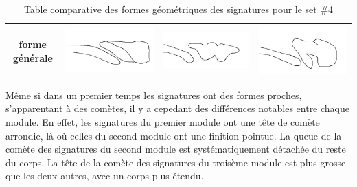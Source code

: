 \begin{table}[h]
\begin{tabular}{|c|c|c|c|}
\hline
\hline
forme générale & \includegraphics[scale=0.2]{images/gen1.png} & \includegraphics[scale=0.2]{images/gen2.png} & \includegraphics[scale=0.2]{images/gen3.png} \\
\hline
\end{tabular}
\caption{Table comparative des formes géométriques des signatures pour le set \#4}
\label{compa}
\end{table}

Même si dans un premier temps les signatures ont des formes proches, s'apparentant à des comètes, il y a cepedant des différences notables entre chaque module. En effet, les signatures du premier module ont une tête de comète arrondie, là où celles du second module ont une finition pointue. La queue de la comète des signatures du second module est systématiquement détachée du reste du corps. La tête de la comète des signatures du troisème module est plus grosse que les deux autres, avec un corps plus étendu.